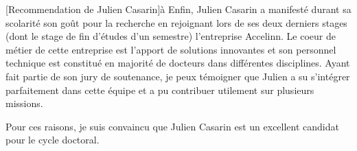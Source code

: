 \documentclass[a4paper,10pt]{article}
\begin{document}
\begin{letter}[Recommendation de Julien Casarin]{à}
Enfin, Julien Casarin a manifesté durant sa scolarité son goût pour la recherche
en rejoignant lors  de ses deux derniers  stages (dont le stage  de fin d'études
d'un semestre) l'entreprise Accelinn. Le coeur de métier de cette entreprise est
l'apport de  solutions innovantes  et son personnel  technique est  constitué en
majorité de docteurs dans différentes disciplines. Ayant fait partie de son jury
de soutenance,  je peux témoigner que  Julien a su s'intégrer  parfaitement dans
cette équipe et a pu contribuer utilement sur plusieurs missions.

 
Pour ces raisons, je suis convaincu que Julien Casarin est un excellent candidat
pour le cycle doctoral.



\end{letter}
\begin{flushright}
\end{flushright}
\end{document}
